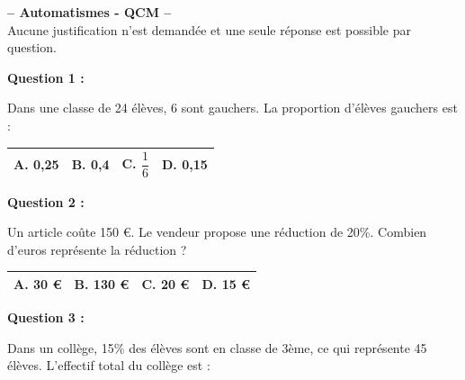 \documentclass[12pt,a4paper]{article}
\begin{document}
\begin{center}
    \Large \textbf{-- Automatismes - QCM --} \\[5pt]
    \normalsize Aucune justification n’est demandée et une seule réponse est possible 
    par question.
\end{center}

\vspace{0.7cm}

\textbf{Question 1 :}
\vspace{5pt}

Dans une classe de 24 élèves, 6 sont gauchers. La proportion d’élèves gauchers est :
\vspace{0.3cm}

\renewcommand{\arraystretch}{3}
\begin{tabular}{|m{3.4cm}|m{3.4cm}|m{3.4cm}|m{3.4cm}|}
\hline
\centering \vspace{-0.3cm} \textbf{A.} 0,25 & 
\centering \vspace{-0.3cm} \textbf{B.} 
0,4 & 
\centering \vspace{-0.3cm} \textbf{C.} $\dfrac{1}{6}$ & 
\centering \vspace{-0.3cm} 
\textbf{D.} 0,15 \tabularnewline
\hline
\end{tabular}

\vspace{0.7cm}

\textbf{Question 2 :}
\vspace{5pt}

Un article coûte 150 €. Le vendeur propose une réduction de 20\%. Combien d'euros 
représente la réduction ?
\vspace{0.3cm}

\renewcommand{\arraystretch}{3}
\begin{tabular}{|m{3.4cm}|m{3.4cm}|m{3.4cm}|m{3.4cm}|}
\hline
\centering \vspace{-0.3cm} \textbf{A.} 30 € & 
\centering \vspace{-0.3cm} \textbf{B.} 
130 € & 
\centering \vspace{-0.3cm} \textbf{C.} 20 € & 
\centering \vspace{-0.3cm} 
\textbf{D.} 15 € \tabularnewline
\hline
\end{tabular}

\vspace{0.7cm}

\textbf{Question 3 :}
\vspace{5pt}

Dans un collège, 15\% des élèves sont en classe de 3ème, ce qui représente 45 élèves. 
L’effectif total du collège est :
\vspace{0.3cm}
\end{document}
